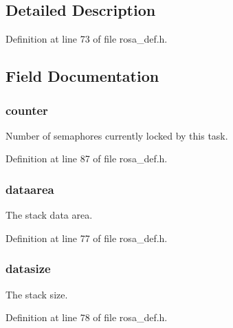 \subsection{Detailed Description}


Definition at line 73 of file rosa\+\_\+def.\+h.



\subsection{Field Documentation}
\hypertarget{structtcb__record__t_a61f7b3cbcedea4bae0c663c892d5d07f}{}
\subsubsection[{counter}]{\setlength{\rightskip}{0pt plus 5cm}counter}\label{structtcb__record__t_a61f7b3cbcedea4bae0c663c892d5d07f}
Number of semaphores currently locked by this task. 

Definition at line 87 of file rosa\+\_\+def.\+h.

\hypertarget{structtcb__record__t_a994219890a698cd01cb7a730d0b34a5a}{}
\subsubsection[{dataarea}]{\setlength{\rightskip}{0pt plus 5cm}dataarea}\label{structtcb__record__t_a994219890a698cd01cb7a730d0b34a5a}
The stack data area. 

Definition at line 77 of file rosa\+\_\+def.\+h.

\hypertarget{structtcb__record__t_aceef3706b1186c624f339e303d4ae373}{}
\subsubsection[{datasize}]{\setlength{\rightskip}{0pt plus 5cm}datasize}\label{structtcb__record__t_aceef3706b1186c624f339e303d4ae373}
The stack size. 

Definition at line 78 of file rosa\+\_\+def.\+h.

\hypertarget{structtcb__record__t_a5b1f6f1eaa44ff5c4f80c23687f4f324}{}
